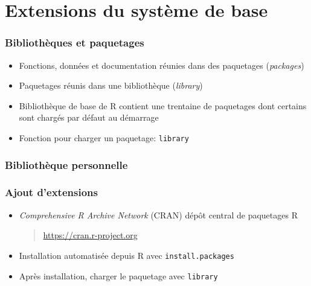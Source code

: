 \section{Extensions du système de base}

\begin{frame}
  \frametitle{Bibliothèques et paquetages}

  \begin{itemize}
  \item Fonctions, données et documentation réunies dans des
    \alert{paquetages} (\emph{packages})
  \item Paquetages réunis dans une \alert{bibliothèque}
    (\emph{library})
  \item Bibliothèque de base de R contient une trentaine de paquetages
    dont certains sont chargés par défaut au démarrage
  \item Fonction pour charger un paquetage: \texttt{library}
  \end{itemize}
\end{frame}

\begin{frame}
  \frametitle{Bibliothèque personnelle}

\end{frame}

\begin{frame}
  \frametitle{Ajout d'extensions}

  \begin{itemize}
  \item \emph{Comprehensive R Archive Network} (CRAN) dépôt central de
    paquetages R
    \begin{quote}
      \url{https://cran.r-project.org}
    \end{quote}
  \item Installation automatisée depuis R avec
    \texttt{install.packages}
  \item Après installation, charger le paquetage avec \texttt{library}
  \end{itemize}

  \pause
\end{frame}

